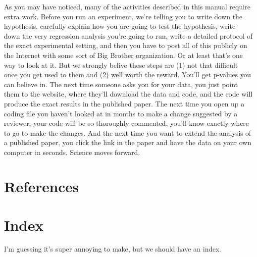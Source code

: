 \documentclass[12pt] {article}
\begin{document}
As you may have noticed, many of the activities described in this manual
require extra work. Before you run an experiment, we're telling you to
write down the hypothesis, carefully explain how you are going to test
the hypothesis, write down the very regression analysis you're going to
run, write a detailed protocol of the exact experimental setting, and
then you have to post all of this publicly on the Internet with some
sort of Big Brother organization. Or at least that's one way to look at
it. But we strongly belive these steps are (1) not that difficult once
you get used to them and (2) well worth the reward. You'll get p-values
you can believe in. The next time someone asks you for your data, you
just point them to the website, where they'll download the data and
code, and the code will produce the exact results in the published
paper. The next time you open up a coding file you haven't looked at in
months to make a change suggested by a reviewer, your code will be so
thoroughly commented, you'll know exactly where to go to make the
changes. And the next time you want to extend the analysis of a
published paper, you click the link in the paper and have the data on
your own computer in seconds. Science moves forward.

\singlespacing
\section{References}\label{references}



\section{Index}\label{index}

I'm guessing it's super annoying to make, but we should have an index.
\end{document}
